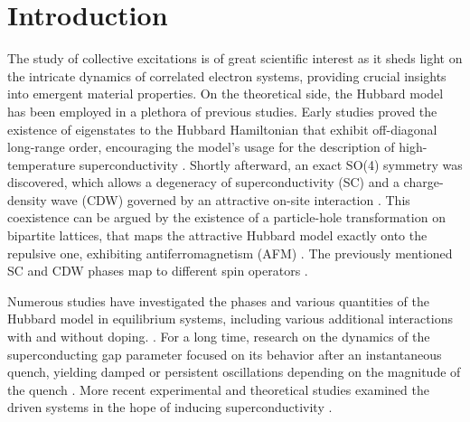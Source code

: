 \documentclass[
    reprint, 
    aps,
    preprintnumbers,
    twocolumn,
    prb,
    superscriptaddress
]{revtex4-2}
\begin{document}

\section{Introduction}\label{sec:introduction}


The study of collective excitations is of great scientific interest as it sheds light on the intricate dynamics of correlated electron systems, providing crucial insights into emergent material properties.
On the theoretical side, the Hubbard model has been employed in a plethora of previous studies. 
Early studies proved the existence of eigenstates to the Hubbard Hamiltonian that exhibit off-diagonal long-range order,
encouraging the model's usage for the description of high-temperature superconductivity \cite{yang89}.
Shortly afterward, an exact SO(4) symmetry was discovered, which allows a degeneracy of superconductivity (SC) and a charge-density wave (CDW) governed by an attractive on-site interaction \cite{yang90}.
This coexistence can be argued by the existence of a particle-hole transformation on bipartite lattices, 
that maps the attractive Hubbard model exactly onto the repulsive one, exhibiting antiferromagnetism (AFM) \cite{Hirsch85}.
The previously mentioned SC and CDW phases map to different spin operators \cite{zitko15,lieb89}.

Numerous studies have investigated the phases and various quantities of the Hubbard model in equilibrium systems, including various additional interactions with and without doping.
\cite{Micnas88,Micnas88b,Micnas89,Dzierzawa92,Kostyrko92,Eriksson95,Staudt00,Onari04,Toschi05,Brackett16,Paki19,romer20,Sushchyev22}.
For a long time, research on the dynamics of the superconducting gap parameter focused on its behavior after an instantaneous quench, 
yielding damped or persistent oscillations depending on the magnitude of the quench \cite{Volkov73,Yuzbashyan05,Yuzbashyan06,Barankov06,Cui19}.
More recent experimental and theoretical studies examined the driven systems in the hope of inducing superconductivity \cite{Nicoletti14,Krull14,Moor14,Casandruc15,patel16,sentef17,Buenemann17}.
\end{document}
